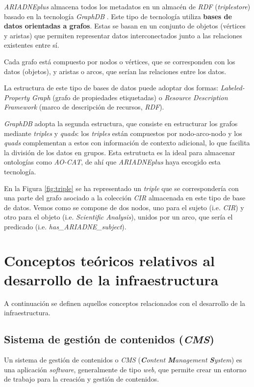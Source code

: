 \emph{ARIADNEplus} almacena todos los metadatos en un almacén de \emph{RDF}
(\emph{triplestore}) basado en la tecnología \emph{GraphDB} \cite{gdb:web}. 
Este tipo de tecnología utiliza \textbf{bases de datos orientadas a grafos}. Estas se
basan en un conjunto de objetos (vértices y aristas) que permiten
representar datos interconectados junto a las relaciones existentes
entre sí. 

Cada grafo está compuesto por nodos o vértices, que se
corresponden con los datos (objetos), y aristas o arcos, que serían las
relaciones entre los datos. 

La estructura de este tipo de bases de datos
puede adoptar dos formas: \emph{Labeled-Property Graph} (grafo de
propiedades etiquetadas) o \emph{Resource Description Framework} (marco
de descripción de recursos, \emph{RDF}).

\emph{GraphDB} adopta la segunda estructura, que consiste en estructurar los
grafos mediante \emph{triples} y \emph{quads}: los \emph{triples} están
compuestos por nodo-arco-nodo y los \emph{quads} complementan a estos
con información de contexto adicional, lo que facilita la división de
los datos en grupos. Esta estrutucta es la ideal para almacenar
ontologías como \emph{AO-CAT}, de ahí que \emph{ARIADNEplus} haya escogido esta
tecnología.


En la Figura \ref{fig:triple} se ha representado un \emph{triple} que se
correspondería con una parte del grafo asociado a la colección \emph{CIR}
almacenada en este tipo de base de datos. Vemos como se compone de dos
nodos, uno para el sujeto (i.e. \emph{CIR}) y otro para el objeto (i.e. \emph{Scientific
Analysis}), unidos por un arco, que sería el predicado
(i.e. \emph{has\_ARIADNE\_subject}).

\section{Conceptos teóricos relativos al desarrollo de la infraestructura}

A continuación se definen aquellos conceptos relacionados con el
desarrollo de la infraestructura.

\subsection{Sistema de gestión de contenidos (\emph{CMS})}

Un sistema de gestión de contenidos o \emph{CMS} \cite{wiki:cms} (\emph{\textbf{C}ontent \textbf{M}anagement \textbf{S}ystem}) es una aplicación \emph{software}, generalmente de tipo \emph{web}, que permite crear un entorno de trabajo para la creación y gestión de contenidos. 

